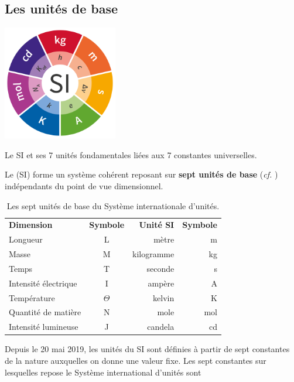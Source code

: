  
\subsection{Les unités de base} 
\begin{marginfigure}[*6]
\centering
	\includegraphics[width=5cm]{img/SI-Illustration-Constants-Colour-Full.png}
\caption{Le SI et ses 7 unités fondamentales liées aux 7 constantes universelles.}
\end{marginfigure}
Le (SI) forme un système cohérent reposant sur \textbf{sept unités de base} (\emph{cf.} ) indépendants du point de vue dimensionnel. 
\begin{table}[ht!]
	\centering
	\footnotesize
	\caption{Les sept unités de base du Système internationale d'unités.}
	\begin{tabular}{lcrr}
		\toprule
		\textbf{Dimension}		& \textbf{Symbole}	& \textbf{Unité SI}	&\textbf{Symbole}\\
		Longueur							& L									& mètre						& m\\
		Masse									& M									& kilogramme			& kg\\
		Temps									& T									& seconde					& s\\
		Intensité électrique	& I									& ampère					& A\\
		Température						& $\Theta$					& kelvin					& K\\
		Quantité de matière		& N									& mole						& mol\\
		Intensité lumineuse		& J									& candela					&cd\\
		\bottomrule
		\end{tabular}
\end{table}
Depuis le 20 mai 2019, les unités du SI sont définies à partir de sept constantes de la nature auxquelles on donne une valeur fixe. Les sept constantes sur lesquelles repose le Système international d'unités sont

